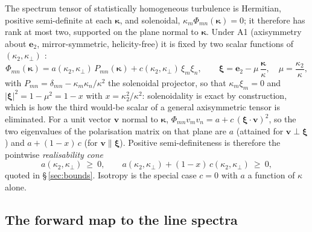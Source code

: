 \documentclass[lineno]{JFM-FLM_Au}
\begin{document}
The spectrum tensor of statistically homogeneous turbulence is Hermitian,
positive semi-definite at each $\boldsymbol{\kappa}$, and solenoidal,
$\kappa_m\Phi_{mn}(\boldsymbol{\kappa})=0$; it therefore has rank at most
two, supported on the plane normal to $\boldsymbol{\kappa}$. Under A1
(axisymmetry about $\boldsymbol{e}_2$, mirror-symmetric, helicity-free) it
is fixed by two scalar functions of $(\kappa_2,\kappa_\perp)$
\citep{Batchelor1946,ChandrasekharAxisym1950,Lindborg1995}:
\begin{equation}
  \Phi_{mn}(\boldsymbol{\kappa})
  = a(\kappa_2,\kappa_\perp)\,P_{mn}(\boldsymbol{\kappa})
  + c(\kappa_2,\kappa_\perp)\,\xi_m\xi_n,
  \qquad
  \boldsymbol{\xi} = \boldsymbol{e}_2 - \mu\,
  \frac{\boldsymbol{\kappa}}{\kappa},
  \quad \mu=\frac{\kappa_2}{\kappa},
  \label{eq:twoscalar}
\end{equation}
with $P_{mn}=\delta_{mn}-\kappa_m\kappa_n/\kappa^2$ the solenoidal
projector, so that $\kappa_m\xi_m=0$ and
$|\boldsymbol{\xi}|^2=1-\mu^2=1-x$ with $x=\kappa_2^2/\kappa^2$:
solenoidality is exact by construction, which is how the third would-be
scalar of a general axisymmetric tensor is eliminated. For a unit vector
$\boldsymbol{v}$ normal to $\boldsymbol{\kappa}$,
$\Phi_{mn}v_mv_n = a + c\,(\boldsymbol{\xi}\cdot\boldsymbol{v})^2$, so the
two eigenvalues of the polarisation matrix on that plane are $a$ (attained
for $\boldsymbol{v}\perp\boldsymbol{\xi}$) and $a+(1-x)\,c$ (for
$\boldsymbol{v}\parallel\boldsymbol{\xi}$). Positive semi-definiteness is
therefore the pointwise \emph{realisability cone}
\begin{equation}
  a(\kappa_2,\kappa_\perp)\ \ge\ 0,
  \qquad
  a(\kappa_2,\kappa_\perp) + (1-x)\,c(\kappa_2,\kappa_\perp)\ \ge\ 0 ,
  \label{eq:cone}
\end{equation}
quoted in \S\,\ref{sec:bounds}. Isotropy is the special case $c=0$ with
$a$ a function of $\kappa$ alone.

\subsection{The forward map to the line spectra}\label{app:fwdmap}
\end{document}

